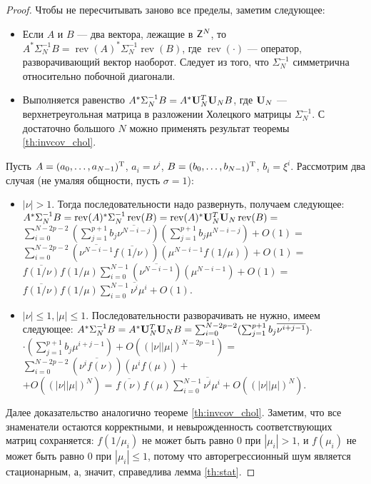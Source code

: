 \documentclass[12pt,a4paper]{article}
\def\rev{\mathop{\mathrm{rev}}}
\begin{document}
\begin{proof}
	Чтобы не пересчитывать заново все пределы, заметим следующее:
	\begin{itemize}
		\item Если $A$ и $B$ --- два вектора, лежащие в $\mathsf{Z}^N$, то $A^* \Sigma_N^{-1} B = \rev(A)^* \Sigma_N^{-1} \rev(B)$, где $\rev(\cdot)$ --- оператор, разворачивающий вектор наоборот. Следует из того, что $\Sigma_N^{-1}$ симметрична относительно побочной диагонали.
		\item Выполняется равенство $A^* \Sigma_N^{-1} B = A^* \mathbf{U}_N^T \mathbf{U}_N B$, где $\mathbf{U}_N$ --- верхнетреугольная матрица в разложении Холецкого матрицы $\Sigma_N^{-1}$. С достаточно большого $N$ можно применять результат теоремы \ref{th:invcov_chol}.
	\end{itemize}
	
	Пусть $A = (a_0, \ldots, a_{N - 1})^{\mathrm{T}}$, $a_i = \nu^i$, $B = (b_0, \ldots, b_{N - 1})^{\mathrm{T}}$, $b_i = \xi^i$. Рассмотрим два случая (не умаляя общности, пусть $\sigma = 1$):
	\begin{itemize}
		\item $|\nu| > 1$. Тогда последовательности надо развернуть, получаем следующее:
		$A^* \Sigma_N^{-1} B = \rev(A)^* \Sigma_N^{-1} \rev(B) =  \rev(A)^* \bfU_N^T \bfU_N  \rev(B) =$ \\$\sum_{i=0}^{N-{2p} -2} (\sum_{j=1}^{p+1}b_j \overline{\nu^{N - i - j}}) (\sum_{j=1}^{p+1}b_j \mu^{N - i - j}) + O(1) = $\\ $\sum_{i=0}^{N-{2p} - 2} (\overline{\nu^{N - i - 1}} \overline{f(1/\nu)})  (\mu^{N - i - 1}f(1/\mu)) + O(1) =$\\ $\overline{f(1/\nu)} f(1/\mu)\sum_{i=0}^{N-1} (\overline{\nu^{N - i - 1}} ) (\mu^{N - i - 1}) + O(1) = $\\
		$\overline{f(1/\nu)} f(1/\mu)\sum_{i=0}^{N-1} \overline{\nu^i} \mu^i + O(1)$.
		\item $|\nu| \le 1, |\mu| \le 1$. Последовательности разворачивать не нужно, имеем следующее:
		$A^* \Sigma_N^{-1} B = A^* \mathbf{U}_N^T \mathbf{U}_N B = \sum_{i=0}^{N-{2p}-2} (\sum_{j=1}^{p+1}b_j \overline{\nu^{
				i + j - 1}}) \cdot$ \\$\cdot (\sum_{j=1}^{p+1}b_j \mu^{i + j - 1}) + O((|\nu||\mu|)^{N - 2p - 1}) =$  
		$\sum_{i=0}^{N-{2p} -2} (\overline{\nu^i f(\nu)})(\mu^i f(\mu)) +$\\ $+ O((|\nu||\mu|)^{N})$ = 
		$\overline{f(\nu)} f(\mu) \sum_{i=0}^{N-1} \overline{\nu^i} \mu^i + O((|\nu||\mu|)^{N})$.
	\end{itemize}
	
	Далее доказательство аналогично теореме \ref{th:invcov_chol}. Заметим, что все знаменатели остаются корректными, и невырожденность соответствующих матриц сохраняется: $f(1/\mu_i)$ не может быть равно $0$ при $|\mu_i| > 1$, и $f(\mu_i)$ не может быть равно $0$ при $|\mu_i| \le 1$, потому что авторегрессионный шум является стационарным, а, значит, справедлива лемма \ref{th:stat}.
\end{proof}
\end{document}
